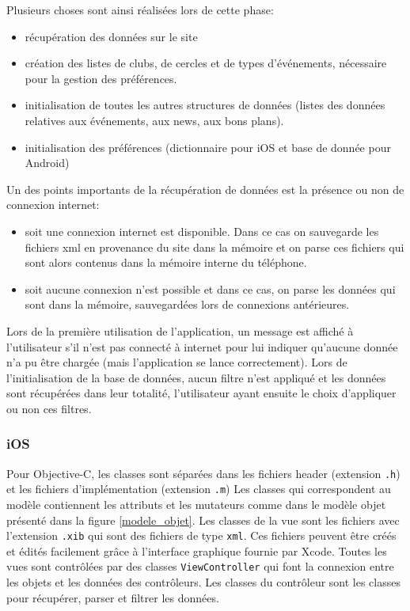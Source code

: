 \documentclass[a4paper, 11px]{article}
\begin{document}
\noindent Plusieurs choses sont ainsi réalisées lors de cette phase:
\begin{itemize}
\item récupération des données sur le site
\item création des listes de clubs, de cercles et de types d'événements, nécessaire pour la gestion des préférences.
\item initialisation de toutes les autres structures de données (listes des données relatives aux événements, aux news, aux bons plans).
\item initialisation des préférences (dictionnaire pour iOS et base de donnée pour Android)
\end{itemize}

\vspace{0.5cm}
\noindent Un des points importants de la récupération de données est la présence ou non de connexion internet: 
\begin{itemize}
\item soit une connexion internet est disponible. Dans ce cas on sauvegarde les fichiers xml en provenance du site dans la mémoire et on parse ces fichiers qui sont alors contenus dans la mémoire interne du téléphone.
\item soit aucune connexion n'est possible et dans ce cas, on parse les données qui sont dans la mémoire, sauvegardées lors de connexions antérieures.\\
\end{itemize}

\noindent Lors de la première utilisation de l'application, un message est affiché à l'utilisateur s'il n'est pas connecté à internet pour lui indiquer qu'aucune donnée n'a pu être chargée (mais l'application se lance correctement).
 Lors de l'initialisation de la base de données, aucun filtre n'est appliqué et les données sont récupérées dans leur totalité, l'utilisateur ayant ensuite le choix d'appliquer ou non ces filtres.

\subsubsection{iOS}
Pour Objective-C, les classes sont séparées dans les fichiers header (extension \texttt{.h}) et les fichiers d'implémentation (extension \texttt{.m})
Les classes qui correspondent au modèle contiennent les attributs et les mutateurs comme dans le modèle objet présenté dans la figure \ref{modele_objet}. Les classes de la vue sont les fichiers avec l'extension \texttt{.xib} qui sont des fichiers de type \texttt{xml}. Ces fichiers peuvent être créés et édités facilement grâce à l'interface graphique fournie par Xcode. Toutes les vues sont contrôlées par des classes \texttt{ViewController} qui font la connexion entre les objets et les données des contrôleurs.
Les classes du contrôleur sont les classes pour récupérer, parser et filtrer les données.\\
\end{document}
